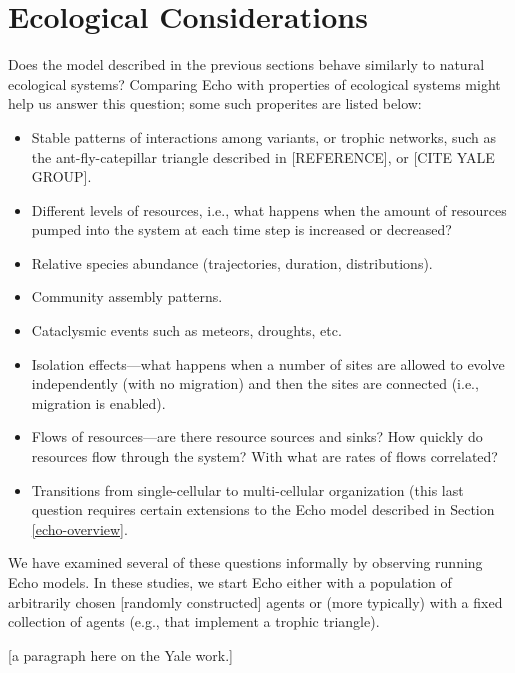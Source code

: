 \section{Ecological Considerations}
\label{species-abundance}

Does the model described in the previous sections behave similarly to
natural ecological systems?  Comparing Echo with properties of ecological 
systems might help us answer this question; some such properites are listed 
below:
\begin{itemize}
\item Stable patterns of interactions among variants, or trophic networks,
such as the ant-fly-catepillar triangle described in [REFERENCE], or
[CITE YALE GROUP].
\item Different levels of resources, i.e., what happens when the
amount of resources pumped into the system at each time step is
increased or decreased?  
\item Relative species abundance (trajectories, duration,
distributions).
\item Community assembly patterns.
\item Cataclysmic events such as meteors, droughts, etc.
\item Isolation effects---what happens when a number of sites are
allowed to evolve independently (with no migration) and then
the sites are connected (i.e., migration is enabled).
\item Flows of resources---are there resource sources and sinks?  How
quickly do resources flow through the system?  With what are rates of
flows correlated?
\item Transitions from single-cellular to multi-cellular organization
(this last question requires certain extensions to the Echo model
described in Section \ref{echo-overview}.
\end{itemize}
We have examined several of these questions informally by observing
running Echo models.  In these studies, we start Echo either with a
population of arbitrarily chosen [randomly constructed] agents or 
(more typically) with a fixed collection of agents (e.g., that implement a 
trophic triangle).

[a paragraph here on the Yale work.]

